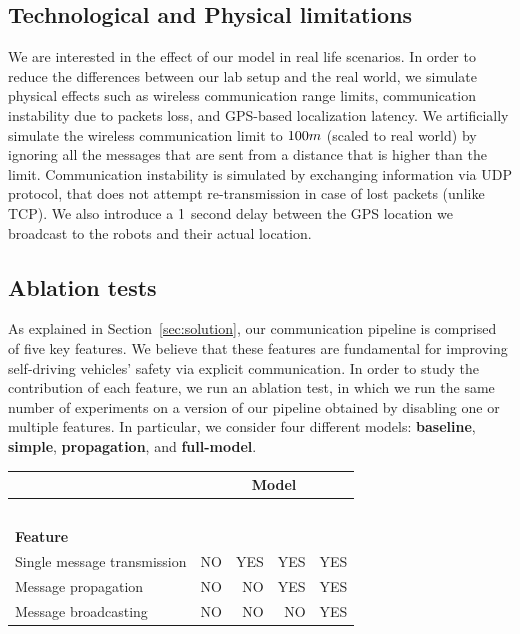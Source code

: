 \subsection{Technological and Physical limitations}
We are interested in the effect of our model in real life scenarios. In order to reduce the differences between 
our lab setup and the real world, we simulate physical effects such as wireless communication range limits, 
communication instability due to packets loss, and GPS-based localization latency.
We artificially simulate the wireless communication limit to $\wireless_limit_meter m$ (scaled to real world) by 
ignoring all the messages that are sent from a distance that is higher than the limit. Communication instability
is simulated by exchanging information via UDP protocol, that does not attempt re-transmission in case
of lost packets (unlike TCP). We also introduce a $\gps_delay_sec$ second delay between the GPS location 
we broadcast to the robots and their actual location.

\subsection{Ablation tests}
As explained in Section~\ref{sec:solution}, our communication pipeline is comprised of five key features.
We believe that these features are fundamental for improving self-driving vehicles' safety via explicit
communication. In order to study the contribution of each feature, we run an ablation test, in which we
run the same number of experiments on a version of our pipeline obtained by disabling one or multiple
features.
In particular, we consider four different models: \textbf{baseline}, \textbf{simple}, \textbf{propagation},
and \textbf{full-model}. 

\begin{table}[H]
\centering
\begin{tabular}{|l|r|r|r|r|}
\hline
& 
\multicolumn{4}{c|}{\textbf{Model}} \\
\hline
& 
	\parbox[t]{2mm}{} 
	& 
	\parbox[t]{2mm}{} 
	&
	\parbox[t]{2mm}{} 
	& 
	\parbox[t]{2mm}{} 
\\
& & & & \\
& & & & \\
& & & & \\
& & & & \\
\textbf{Feature} & & & & \\
\hline
Single message transmission & NO & YES & YES & YES \\
\hline
Message propagation & NO & NO & YES & YES \\
\hline
Message broadcasting & NO & NO & NO & YES \\
\hline
\end{tabular}
\end{table}
 

